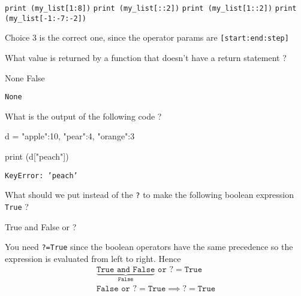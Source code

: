 \documentclass[12pt,a4paper]{exam}
\begin{document}
\begin{questions}
\begin{checkboxes}
\choice \texttt{print (my\_list[1:8])}
\choice \texttt{print (my\_list[::2])}
\choice \texttt{print (my\_list[1::2])}
\choice \texttt{print (my\_list[-1:-7:-2])}
\end{checkboxes}
\begin{solution}
Choice 3 is the correct one, since the operator params are \texttt{[start:end:step]}
\end{solution}
\question
What value is returned by a function that doesn't have a return statement ?

\begin{checkboxes}
\choice None
\choice False
\end{checkboxes}
\begin{solution}
\texttt{None}
\end{solution}
\question
What is the output of the following code ?

\begin{ipython}
d = {"apple":10, "pear":4, "orange":3}

print (d["peach"])
\end{ipython}
\makeemptybox{3cm}
\begin{solution}
\texttt{KeyError: 'peach'}
\end{solution}
\question
What should we put instead of the \texttt{?} to make the following boolean expression \texttt{True} ?
\begin{ipython}
True and False or ?
\end{ipython}
\fillwithlines{3cm}
\begin{solution}
You need \texttt{?=True} since the boolean operators have the same precedence so the expression is evaluated from left to right.
Hence
\begin{equation*}
  \begin{gathered}
    \underbrace{\texttt{True and False}}_{\texttt{False}}\texttt{ or ?} = \texttt{True} \\
    \texttt{False or ?} = \texttt{True} \implies \texttt{?} = \texttt{True} \\
    \end{gathered}
\end{equation*}
\end{solution}


\end{questions}
\end{document}

